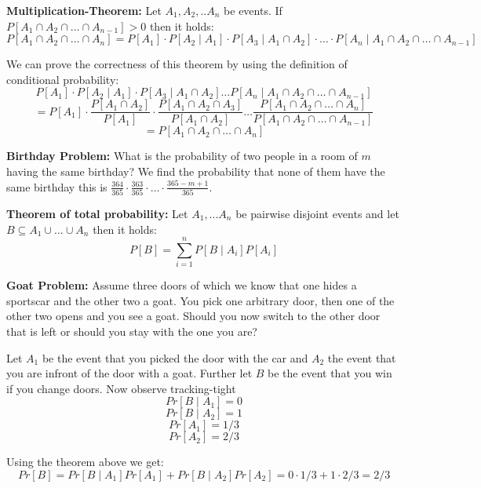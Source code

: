 \begin{theorem}

\textbf{Multiplication-Theorem: } Let $A_1, A_2, .. A_n$ be events. If $P[A_1 \cap A_2 \cap \dots \cap
    A_{n-1}] > 0$ then it holds:
    $$P[A_1 \cap A_2 \cap \dots \cap A_n] = P[A_1] \cdot P[A_2 \mid A_1] \cdot P[A_3 \mid A_1 \cap A_2]
    \cdot \dots \cdot P[A_n \mid A_1 \cap A_2 \cap \dots \cap A_{n-1}]$$
    
\end{theorem}

    We can prove the correctness of this theorem by using the definition of conditional probability:
    $$P[A_1] \cdot P[A_2 \mid A_1] \cdot P[A_3 \mid A_1 \cap A_2] \dots P[A_n \mid A_1 \cap A_2 \cap \dots \cap
    A_{n-1}]$$
    $$ = P[A_1] \cdot \frac{P[A_1 \cap A_2]}{P[A_1]} \cdot \frac{P[A_1 \cap A_2 \cap A_3]}{P[A_1 \cap A_2]}
    \dots \frac{P[A_1 \cap A_2 \cap \dots \cap A_n]}{P[A_1 \cap A_2 \cap \dots \cap A_{n-1}]}$$
    $$ = P[A_1 \cap A_2 \cap \dots \cap A_n]$$

    \begin{example}

\textbf{Birthday Problem: } What is the probability of two people in a room of $m$ having the same
    birthday? We find the probability
    that none of them have the same birthday this is $\frac{364}{365} \cdot \frac{363}{365} \cdot \dots
    \cdot \frac{365-m+1}{365}$.
    
\end{example}

\begin{theorem}

\textbf{Theorem of total probability: }Let $A_1, ... A_n$ be pairwise disjoint events and let $B \subseteq
    A_1 \cup ... \cup A_n$ then it
    holds:
    $$P[B] = \sum_{i=1}^n P[B \mid A_i] P[A_i]$$
    
\end{theorem}

\begin{example}

\textbf{Goat Problem: } Assume three doors of which we know that one hides a sportscar and the other two a
    goat. You pick one
    arbitrary door, then one of the other two opens and you see a goat. Should you now switch to the other
    door
    that is left or should you stay with the one you are?

    Let $A_1$ be the event that you picked the door with the car and $A_2$ the event that you are infront of
    the door with a goat. Further let $B$ be the event that you win if you change doors. Now observe
    tracking-tight
    $$Pr[B \mid A_1] = 0$$
    $$Pr[B \mid A_2] = 1$$
    $$Pr[A_1] = 1/3$$
    $$Pr[A_2] = 2/3$$

    Using the theorem above we get:
    $$Pr[B] = Pr[B \mid A_1] Pr[A_1] + Pr[B \mid A_2] Pr[A_2] = 0 \cdot 1/3 + 1 \cdot 2/3 = 2/3$$
    
\end{example}

